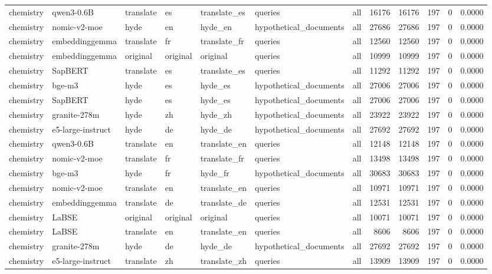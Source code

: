 \begin{tabular}{lllllllrrrrr}
chemistry & qwen3-0.6B & translate & es & translate\_es & queries & all & 16176 & 16176 & 197 & 0 & 0.0000 \\
chemistry & nomic-v2-moe & hyde & en & hyde\_en & hypothetical\_documents & all & 27686 & 27686 & 197 & 0 & 0.0000 \\
chemistry & embeddinggemma & translate & fr & translate\_fr & queries & all & 12560 & 12560 & 197 & 0 & 0.0000 \\
chemistry & embeddinggemma & original & original & original & queries & all & 10999 & 10999 & 197 & 0 & 0.0000 \\
chemistry & SapBERT & translate & es & translate\_es & queries & all & 11292 & 11292 & 197 & 0 & 0.0000 \\
chemistry & bge-m3 & hyde & es & hyde\_es & hypothetical\_documents & all & 27006 & 27006 & 197 & 0 & 0.0000 \\
chemistry & SapBERT & hyde & es & hyde\_es & hypothetical\_documents & all & 27006 & 27006 & 197 & 0 & 0.0000 \\
chemistry & granite-278m & hyde & zh & hyde\_zh & hypothetical\_documents & all & 23922 & 23922 & 197 & 0 & 0.0000 \\
chemistry & e5-large-instruct & hyde & de & hyde\_de & hypothetical\_documents & all & 27692 & 27692 & 197 & 0 & 0.0000 \\
chemistry & qwen3-0.6B & translate & en & translate\_en & queries & all & 12148 & 12148 & 197 & 0 & 0.0000 \\
chemistry & nomic-v2-moe & translate & fr & translate\_fr & queries & all & 13498 & 13498 & 197 & 0 & 0.0000 \\
chemistry & bge-m3 & hyde & fr & hyde\_fr & hypothetical\_documents & all & 30683 & 30683 & 197 & 0 & 0.0000 \\
chemistry & nomic-v2-moe & translate & en & translate\_en & queries & all & 10971 & 10971 & 197 & 0 & 0.0000 \\
chemistry & embeddinggemma & translate & de & translate\_de & queries & all & 12531 & 12531 & 197 & 0 & 0.0000 \\
chemistry & LaBSE & original & original & original & queries & all & 10071 & 10071 & 197 & 0 & 0.0000 \\
chemistry & LaBSE & translate & en & translate\_en & queries & all & 8606 & 8606 & 197 & 0 & 0.0000 \\
chemistry & granite-278m & hyde & de & hyde\_de & hypothetical\_documents & all & 27692 & 27692 & 197 & 0 & 0.0000 \\
chemistry & e5-large-instruct & translate & zh & translate\_zh & queries & all & 13909 & 13909 & 197 & 0 & 0.0000 \\

\end{tabular}
